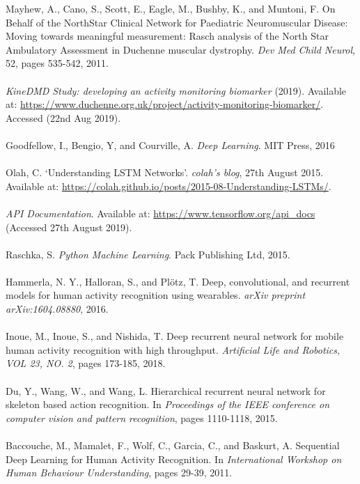 \documentclass[12pt,twoside]{report}
\begin{document}
\quad [10] Mayhew, A., Cano, S., Scott, E., Eagle, M., Bushby, K., and Muntoni, F. On Behalf of the NorthStar Clinical Network for Paediatric Neuromuscular Disease: Moving towards meaningful measurement: Rasch analysis of the North Star Ambulatory Assessment in Duchenne muscular dystrophy. \textit{Dev Med Child Neurol}, 52, pages 535-542, 2011.\\ \\
\quad [11] \textit{KineDMD Study: developing an activity monitoring biomarker} (2019). Available at: \url{https://www.duchenne.org.uk/project/activity-monitoring-biomarker/}. Accessed (22nd Aug 2019).\\ \\
\quad [12] Goodfellow, I., Bengio, Y, and Courville, A. \textit{Deep Learning}. MIT Press, 2016\\ \\
\quad [13] Olah, C. ‘Understanding LSTM Networks’. \textit{colah's blog}, 27th August 2015. Available at: \url{https://colah.github.io/posts/2015-08-Understanding-LSTMs/}.\\ \\
\quad [14] \textit{API Documentation}. Available at: \url{https://www.tensorflow.org/api\_docs} (Accessed 27th August 2019).\\ \\
\quad [15] Raschka, S. \textit{Python Machine Learning}. Pack Publishing Ltd, 2015.\\ \\
\quad [16] Hammerla, N. Y., Halloran, S., and Plötz, T. Deep, convolutional, and recurrent models for human activity recognition using wearables. \textit{arXiv preprint arXiv:1604.08880}, 2016.\\ \\
\quad [17] Inoue, M., Inoue, S., and Nishida, T. Deep recurrent neural network for mobile human activity recognition with high throughput. \textit{Artificial Life and Robotics, VOL 23, NO. 2}, pages 173-185, 2018.\\ \\
\quad [18] Du, Y., Wang, W., and Wang, L. Hierarchical recurrent neural network for skeleton based action recognition. In \textit{Proceedings of the IEEE conference on computer vision and pattern recognition}, pages 1110-1118, 2015.\\ \\
\quad [19] Baccouche, M., Mamalet, F., Wolf, C., Garcia, C., and Baskurt, A. Sequential Deep Learning for Human Activity Recognition. In \textit{International Workshop on Human Behaviour Understanding}, pages 29-39, 2011.\\ \\
\end{document}
